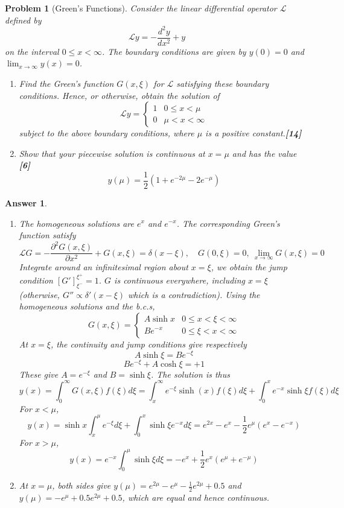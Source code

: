 \documentclass[a4paper]{article}
\newtheorem{ans}{Answer}[section]
\theoremstyle{new}
\newtheorem{qns}{Problem}[section]
\begin{document}
\newpage
\begin{qns}[Green's Functions]
Consider the linear differential operator $\mathcal{L}$ defined by
$$\mathcal{L}y=-\frac{d^2y}{dx^2}+y$$
on the interval $0\leq x<\infty$. The boundary conditions are given by $y(0) = 0$ and $\lim_{x\rightarrow\infty}y(x)=0$.
\begin{enumerate}[label=(\alph*)]
\item  Find the Green’s function $G(x,\xi)$ for $\mathcal{L}$ satisfying these boundary conditions. Hence, or otherwise, obtain the solution of
$$\mathcal{L}y=
\left\{
        \begin{array}{ll}
      1 & 0\leq x<\mu \\
      0 & \mu<x<\infty
        \end{array}
    \right.$$
subject to the above boundary conditions, where $\mu$ is a positive constant.\hfill\textbf{[14]}
\item Show that your piecewise solution is continuous at $x=\mu$ and has the value \hfill\textbf{[6]}
$$y(\mu)=\frac{1}{2}(1+e^{-2\mu}-2e^{-\mu})$$
\end{enumerate}
\end{qns}
\begin{ans}\leavevmode
\begin{enumerate}[label=(\alph*)]
    \item The homogeneous solutions are $e^x$ and $e^{-x}$. The corresponding Green's function satisfy 
    $$\mathcal{L}G=-\frac{\partial^2G(x,\xi)}{\partial x^2}+G(x,\xi)=\delta(x-\xi),\quad G(0,\xi)=0,~\lim_{x\rightarrow\infty}G(x,\xi)=0$$
    Integrate around an infinitesimal region about $x=\xi$, we obtain the jump condition $[G']_{\xi^-}^{\xi^+}=1$. $G$ is continuous everywhere, including $x=\xi$ (otherwise, $G''\propto\delta'(x-\xi)$ which is a contradiction). Using the homogeneous solutions and the b.c.s,
    $$G(x,\xi)=
\left\{
        \begin{array}{ll}
      A\sinh x & 0\leq x<\xi<\infty \\
      Be^{-x} & 0\leq\xi<x<\infty
        \end{array}
    \right.$$
At $x=\xi$, the continuity and jump conditions give respectively
$$A\sinh\xi=Be^{-\xi}$$
$$Be^{-\xi}+A\cosh\xi=+1$$
These give $A=e^{-\xi}$ and $B=\sinh\xi$. The solution is thus
$$y(x)=\int_0^\infty G(x,\xi)f(\xi)d\xi=\int_x^\infty e^{-\xi}\sinh(x)f(\xi)d\xi+\int_0^xe^{-x}\sinh\xi f(\xi)d\xi$$
For $x<\mu$, 
$$y(x)=\sinh x\int_x^\mu e^{-\xi}d\xi+\int_0^x\sinh\xi e^{-x}d\xi=e^{2x}-e^x-\frac{1}{2}e^\mu(e^x-e^{-x})$$
For $x>\mu$,
$$y(x)=e^{-x}\int_0^\mu\sinh\xi d\xi=-e^x+\frac{1}{2}e^x(e^\mu+e^{-\mu})$$
\item At $x=\mu$, both sides give $y(\mu)=e^{2\mu}-e^\mu-\frac{1}{2}e^{2\mu}+0.5$ and $y(\mu)=-e^\mu+0.5e^{2\mu}+0.5$, which are equal and hence continuous.
\end{enumerate}
\end{ans}
\end{document}
